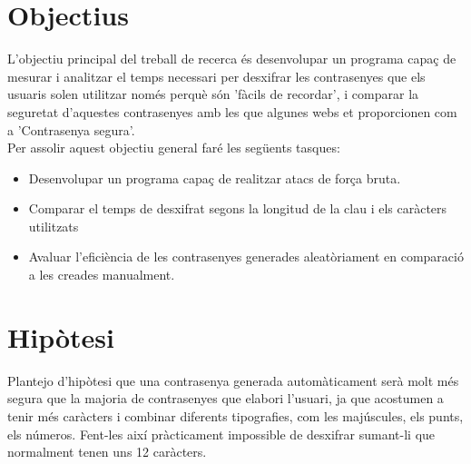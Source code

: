 \section{Objectius}
L'objectiu principal del treball de recerca és desenvolupar un programa capaç de mesurar i analitzar el temps necessari per desxifrar les contrasenyes que els usuaris solen utilitzar només perquè són 'fàcils de recordar', i comparar la seguretat d'aquestes contrasenyes amb les que algunes webs et proporcionen com a 'Contrasenya segura'.\\
Per assolir aquest objectiu general faré les següents tasques:
\begin{itemize}
    \item Desenvolupar un programa capaç de realitzar atacs de força bruta.
    \item Comparar el temps de desxifrat segons la longitud de la clau i els caràcters utilitzats
    \item Avaluar l'eficiència de les contrasenyes generades aleatòriament en comparació a les creades manualment.
\end{itemize}

\section{Hipòtesi}
Plantejo d'hipòtesi que una contrasenya generada automàticament serà molt més segura que la majoria de contrasenyes que elabori l'usuari, ja que acostumen a tenir més caràcters i combinar diferents tipografies, com les majúscules, els punts, els números. Fent-les així pràcticament impossible de desxifrar sumant-li que normalment tenen uns 12 caràcters.
